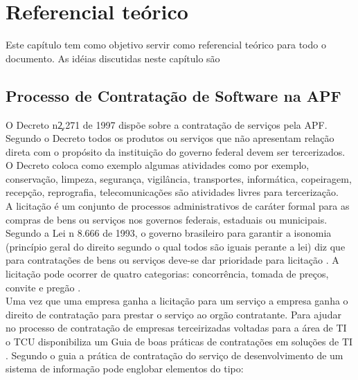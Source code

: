 
\chapter[Referencial Teórico]{Referencial teórico}
	
	Este capítulo tem como objetivo servir como referencial teórico para todo o documento. As idéias discutidas neste capítulo são
	
\section{Processo de Contratação de Software na APF}
O Decreto n\c 2.271 de 1997 \cite{decreto_2271} dispõe sobre a contratação de serviços pela APF. Segundo o Decreto todos os produtos ou serviços que não apresentam relação direta com o propósito da instituição do governo federal devem ser tercerizados. O Decreto coloca como exemplo algumas atividades como por exemplo, conservação, limpeza, segurança, vigilância, transportes, informática, copeiragem, recepção, reprografia, telecomunicações são atividades livres para tercerização.
\\A licitação é um conjunto de processos administrativos de caráter formal para as compras de bens ou serviços nos governos federais, estaduais ou municipais. Segundo a Lei  n 8.666 de 1993, o governo brasileiro para garantir a isonomia (princípio geral do direito segundo o qual todos são iguais perante a lei) diz que para contratações de bens ou serviços deve-se dar prioridade para licitação \cite{Lei_1993}. A licitação pode ocorrer de quatro categorias: concorrência, tomada de preços, convite e pregão \cite{brazil_licitacoes_2010}.
\\Uma vez que uma empresa ganha a licitação para um serviço a empresa ganha o direito de contratação para prestar o serviço ao orgão contratante. Para ajudar no processo de contratação de empresas terceirizadas voltadas para a área de TI o TCU disponibiliza um Guia de boas práticas de contratações em soluções de TI \cite{guia_boas_praticas}. Segundo o guia a prática de contratação do serviço de desenvolvimento de um sistema de informação pode englobar elementos do tipo:
